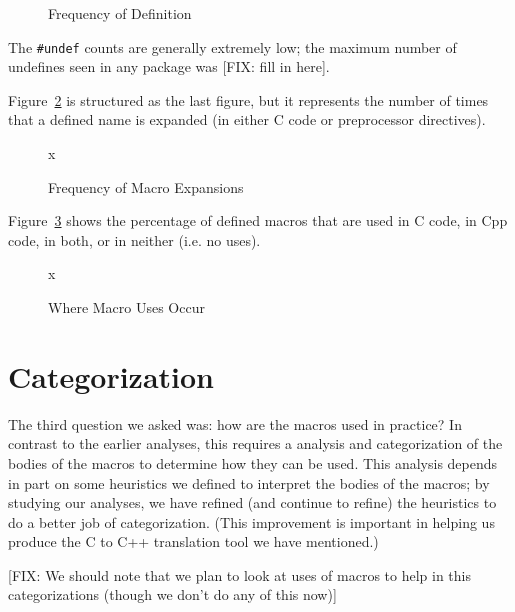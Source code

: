 \begin{figure}
[FIX]
%
\caption{Frequency of Definition\label{fig:define_count}}
\end{figure}

The \verb+#undef+ counts are generally extremely low; the maximum
number of undefines seen in any package was [FIX: fill in here].

Figure~\ref{fig:use_count} is structured as the last figure, but it
represents the number of times that a defined name is expanded (in
either C code or preprocessor directives).

\begin{figure}
x
%
\caption{Frequency of Macro Expansions\label{fig:use_count}}
\end{figure}

Figure~\ref{fig:define_usage} shows the percentage of defined macros
that are used in C code, in Cpp code, in both, or in neither (i.e. no
uses).

\begin{figure}
x
%
\caption{Where Macro Uses Occur\label{fig:define_usage}}
\end{figure}


\section{Categorization}\label{sec:categorization}

The third question we asked was: how are the macros used in practice?
In contrast to the earlier analyses, this requires a analysis and
categorization of the bodies of the macros to determine how they can
be used.  This analysis depends in part on some heuristics we defined
to interpret the bodies of the macros; by studying our analyses, we
have refined (and continue to refine) the heuristics to do a better
job of categorization.  (This improvement is important in helping us
produce the C to C++ translation tool we have mentioned.)

[FIX: We should note that we plan to look at uses of macros to help in
this categorizations (though we don't do any of this now)]

